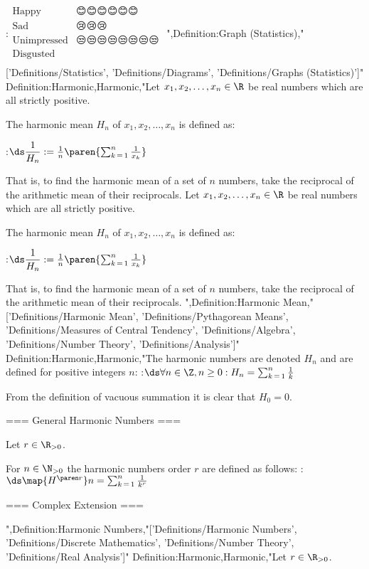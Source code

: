 :$\begin {array} {r|l} \text {Happy} & 😊😊😊😊😊😊 \\ \text {Sad} & 😢😢😢 \\ \text {Unimpressed} & 😒😒😒😒😒😒😒😒 \\ \text {Disgusted} & 🤢🤢🤢🤢 \\ \end {array}$
",Definition:Graph (Statistics),"['Definitions/Statistics', 'Definitions/Diagrams', 'Definitions/Graphs (Statistics)']"
Definition:Harmonic,Harmonic,"Let $x_1, x_2, \ldots, x_n \in \R$ be real numbers which are all strictly positive.

The harmonic mean $H_n$ of $x_1, x_2, \ldots, x_n$ is defined as:

:$\ds \dfrac 1 {H_n} := \frac 1 n \paren {\sum_{k \mathop = 1}^n \frac 1 {x_k} }$

That is, to find the harmonic mean of a set of $n$ numbers, take the reciprocal of the arithmetic mean of their reciprocals.
Let $x_1, x_2, \ldots, x_n \in \R$ be real numbers which are all strictly positive.

The harmonic mean $H_n$ of $x_1, x_2, \ldots, x_n$ is defined as:

:$\ds \dfrac 1 {H_n} := \frac 1 n \paren {\sum_{k \mathop = 1}^n \frac 1 {x_k} }$

That is, to find the harmonic mean of a set of $n$ numbers, take the reciprocal of the arithmetic mean of their reciprocals.
",Definition:Harmonic Mean,"['Definitions/Harmonic Mean', 'Definitions/Pythagorean Means', 'Definitions/Measures of Central Tendency', 'Definitions/Algebra', 'Definitions/Number Theory', 'Definitions/Analysis']"
Definition:Harmonic,Harmonic,"The harmonic numbers are denoted $H_n$ and are defined for positive integers $n$:
:$\ds \forall n \in \Z, n \ge 0: H_n = \sum_{k \mathop = 1}^n \frac 1 k$

From the definition of vacuous summation it is clear that $H_0 = 0$.

=== General Harmonic Numbers ===

Let $r \in \R_{>0}$.

For $n \in \N_{> 0}$ the harmonic numbers order $r$ are defined as follows:
:$\ds \map {H^{\paren r} } n = \sum_{k \mathop = 1}^n \frac 1 {k^r}$


=== Complex Extension ===



",Definition:Harmonic Numbers,"['Definitions/Harmonic Numbers', 'Definitions/Discrete Mathematics', 'Definitions/Number Theory', 'Definitions/Real Analysis']"
Definition:Harmonic,Harmonic,"Let $r \in \R_{>0}$.

